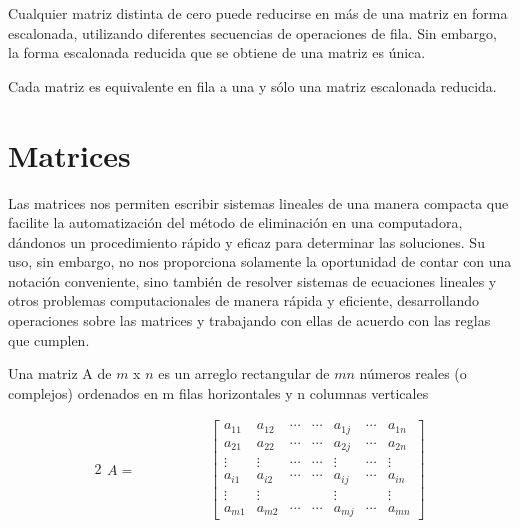 \documentclass{article}
\begin{document}
Cualquier matriz distinta de cero puede reducirse en más de una matriz en forma escalonada, utilizando diferentes secuencias de operaciones de fila. Sin embargo, la forma escalonada reducida que se obtiene de una matriz es única.

\begin{tcolorbox}[colback=green!20!white,colframe=green!80!black,title=Unicidad de la Forma Escalonada Reducida]
    Cada matriz es equivalente en fila a una y sólo una matriz escalonada reducida.
\end{tcolorbox}

\section{Matrices}

Las matrices nos permiten escribir sistemas lineales de una manera compacta que facilite la automatización del método de eliminación en una computadora, dándonos un procedimiento rápido y eficaz para determinar las soluciones. Su uso, sin embargo, no nos proporciona solamente la oportunidad de contar con una notación conveniente, sino también de resolver sistemas de ecuaciones lineales y otros problemas computacionales de manera rápida y eficiente, desarrollando operaciones sobre las matrices y trabajando con ellas de acuerdo con las reglas que cumplen.

\begin{tcolorbox}[colback=blue!10!white,colframe=blue!60!black,title=Definición]
    Una matriz A de $m$ x $n$ es un arreglo rectangular de $mn$ números reales (o complejos) ordenados en m filas horizontales y n columnas verticales
\end{tcolorbox}

\begin{alignat*}{2}
    \begin{split}
        A = 
    \end{split} 
& \hspace{ 4em}%
    \begin{bmatrix}
        a_{11} & a_{12} & \dotsb & \dotsb & a_{1j} & \dotsb & a_{1n}\\
        a_{21} & a_{22} & \dotsb & \dotsb & a_{2j} & \dotsb & a_{2n}\\
        \vdots & \vdots & \dotsb & \dotsb & \vdots & \dotsb & \vdots\\
        a_{i1} & a_{i2} & \dotsb & \dotsb & a_{ij} & \dotsb & a_{in}\\
        \vdots & \vdots &  &  & \vdots &  & \vdots\\
        a_{m1} & a_{m2} & \dotsb & \dotsb & a_{mj} & \dotsb & a_{mn}
    \end{bmatrix} 
\end{alignat*}
\end{document}
